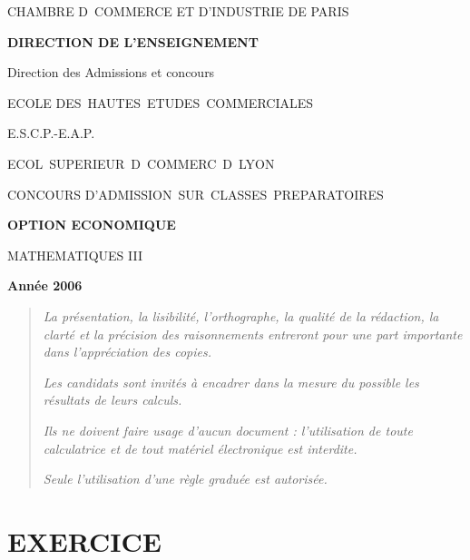 \documentclass[11pt]{article}%
\begin{document}
\begin{center}
{\small CHAMBRE D\E\ COMMERCE ET D'INDUSTRIE DE PARIS}

\textbf{DIRECTION DE L'ENSEIGNEMENT}

Direction des Admissions et concours

\underline{\hspace*{3cm}}

{\Large ECOLE DES\ HAUTES\ ETUDES\ COMMERCIALES}

{\Large E.S.C.P.-E.A.P.}

{\Large ECOL\E\ SUPERIEUR\E\ D\E\ COMMERC\E\ D\E\ LYON}{\large }

CONCOURS D'ADMISSION\ SUR\ CLASSES\ PREPARATOIRES

\underline{\hspace*{3cm}}

\textbf{OPTION ECONOMIQUE}

{\Large MATHEMATIQUES III}

\textbf{Année 2006}

\underline{\hspace*{3cm}}
\end{center}

\begin{quotation}
\noindent \textsl{La présentation, la lisibilité, l'orthographe, la
qualité
de la rédaction, la clarté et la précision des raisonnements entreront
pour
une part importante dans l'appréciation des copies.}

\noindent \textsl{Les candidats sont invités à encadrer dans la mesure
du
possible les résultats de leurs calculs.}

\noindent \textsl{Ils ne doivent faire usage d'aucun document :
l'utilisation de toute calculatrice et de tout matériel électronique
est
interdite.}

\noindent \textsl{Seule l'utilisation d'une règle graduée est
autorisée.}

\noindent \textsl{\hrulefill }
\end{quotation}

\section*{EXERCICE}
\end{document}
